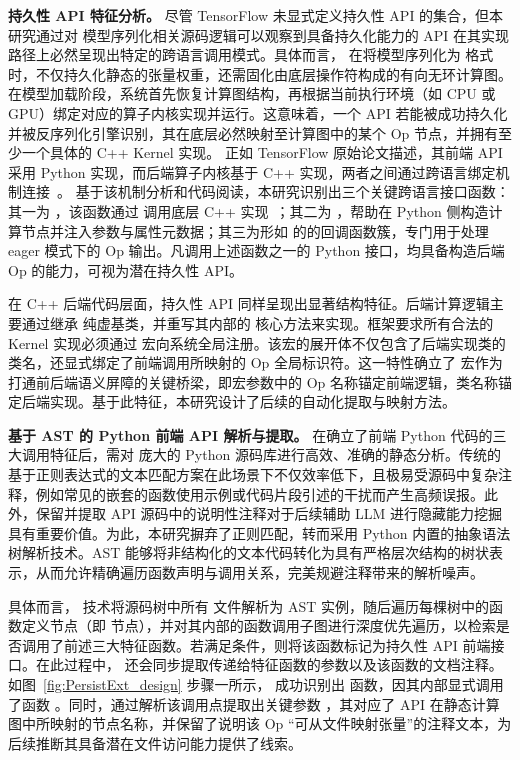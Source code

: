 \textbf{持久性 API 特征分析。}
尽管 TensorFlow 未显式定义持久性 API 的集合，但本研究通过对  模型序列化相关源码逻辑可以观察到具备持久化能力的 API 在其实现路径上必然呈现出特定的跨语言调用模式。具体而言， 在将模型序列化为  格式时，不仅持久化静态的张量权重，还需固化由底层操作符构成的有向无环计算图。在模型加载阶段，系统首先恢复计算图结构，再根据当前执行环境（如 CPU 或 GPU）绑定对应的算子内核实现并运行。这意味着，一个 API 若能被成功持久化并被反序列化引擎识别，其在底层必然映射至计算图中的某个 Op 节点，并拥有至少一个具体的 C++ Kernel 实现。
正如 TensorFlow 原始论文描述，其前端 API 采用 Python 实现，而后端算子内核基于 C++ 实现，两者之间通过跨语言绑定机制连接~\cite{abadi2016tensorflow}。
基于该机制分析和代码阅读，本研究识别出三个关键跨语言接口函数：其一为 ，该函数通过  调用底层 C++ 实现~\cite{pybind11}；其二为 ，帮助在 Python 侧构造计算节点并注入参数与属性元数据；其三为形如  的的回调函数簇，专门用于处理 eager 模式下的 Op 输出。凡调用上述函数之一的 Python 接口，均具备构造后端 Op 的能力，可视为潜在持久性 API。

在 C++ 后端代码层面，持久性 API 同样呈现出显著结构特征。后端计算逻辑主要通过继承  纯虚基类，并重写其内部的  核心方法来实现。框架要求所有合法的 Kernel 实现必须通过  宏向系统全局注册。该宏的展开体不仅包含了后端实现类的类名，还显式绑定了前端调用所映射的 Op 全局标识符。这一特性确立了  宏作为打通前后端语义屏障的关键桥梁，即宏参数中的 Op 名称锚定前端逻辑，类名称锚定后端实现。基于此特征，本研究设计了后续的自动化提取与映射方法。

\textbf{基于 AST 的 Python 前端 API 解析与提取。}
在确立了前端 Python 代码的三大调用特征后，需对  庞大的 Python 源码库进行高效、准确的静态分析。传统的基于正则表达式的文本匹配方案在此场景下不仅效率低下，且极易受源码中复杂注释，例如常见的嵌套的函数使用示例或代码片段引述的干扰而产生高频误报。此外，保留并提取 API 源码中的说明性注释对于后续辅助 LLM 进行隐藏能力挖掘具有重要价值。为此，本研究摒弃了正则匹配，转而采用 Python 内置的抽象语法树解析技术。AST 能够将非结构化的文本代码转化为具有严格层次结构的树状表示，从而允许精确遍历函数声明与调用关系，完美规避注释带来的解析噪声。

具体而言， 技术将源码树中所有  文件解析为 AST 实例，随后遍历每棵树中的函数定义节点（即  节点），并对其内部的函数调用子图进行深度优先遍历，以检索是否调用了前述三大特征函数。若满足条件，则将该函数标记为持久性 API 前端接口。在此过程中， 还会同步提取传递给特征函数的参数以及该函数的文档注释。如图~\ref{fig:PersistExt_design} 步骤一所示， 成功识别出  函数，因其内部显式调用了函数 。同时，通过解析该调用点提取出关键参数 ，其对应了 API 在静态计算图中所映射的节点名称，并保留了说明该 Op “可从文件映射张量”的注释文本，为后续推断其具备潜在文件访问能力提供了线索。

